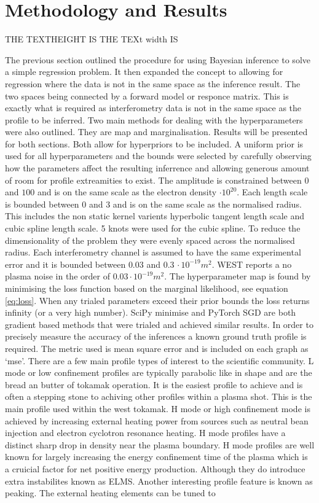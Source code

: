\chapter{Methodology and Results}

THE TEXTHEIGHT IS \the\textheight
THE TEXt width IS \the\textwidth

The previous section outlined the procedure for using Bayesian inference to solve a simple regression problem. It then expanded the concept to allowing for regression where the data is not in the same space as the inference result. The two spaces being connected by a forward model or responce matrix. This is exactly what is required as interferometry data is not in the same space as the profile to be inferred. Two main methods for dealing with the hyperparameters were also outlined. They are \gls{map} and marginalisation. Results will be presented for both sections. Both allow for hyperpriors to be included. A uniform prior is used for all hyperparameters and the bounds were selected by carefully observing how the parameters affect the resulting inferrence and allowing generous amount of room for profile extreamities to exist. The amplitude is constrained between $0$ and $100$ and is on the same scale as the electron density $\cdot 10^{20}$. Each length scale is bounded between 0 and 3 and is on the same scale as the normalised radius. This includes the non static kernel varients hyperbolic tangent length scale and cubic spline length scale. 5 knots were used for the cubic spline. To reduce the dimensionality of the problem they were evenly spaced across the normalised radius. Each interferometry channel is assumed to have the same experimental error and it is bounded between $0.03$ and $0.3\, \cdot10^{-19}m^2$. WEST reports a no plasma noise in the order of $0.03 \cdot10^{-19}m^2$. The hyperparameter \gls{map} is found by minimising the loss function based on the marginal likelihood, see equation \ref{eq:loss}. When any trialed parameters exceed their prior bounds the loss returns infinity (or a very high number). SciPy minimise and PyTorch SGD are both gradient based methods that were trialed and achieved similar results. In order to precisely measure the accuracy of the inferences a known ground truth profile is required. The metric used is mean square error and is included on each graph as `mse'. There are a few main profile types of interest to the scientific community. L mode or low confinement profiles are typically parabolic like in shape and are the bread an butter of tokamak operation. It is the easiest profile to achieve and is often a stepping stone to achiving other profiles within a plasma shot. This is the main profile used within the \gls{west} tokamak. H mode or high confinement mode is achieved by increasing external heating power from sources such as neutral bean injection and electron cyclotron resonance heating. H mode profiles have a distinct sharp drop in density near the plasma boundary. H mode profiles are well known for largely increasing the energy confinement time of the plasma which is a cruicial factor for net positive energy production. Although they do introduce extra instabilites known as ELMS. Another interesting profile feature is known as peaking. The external heating elements can be tuned to 